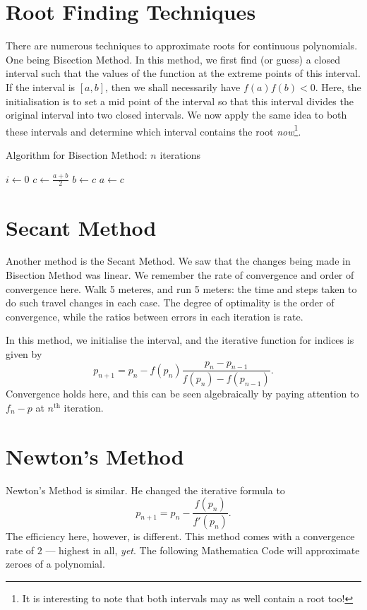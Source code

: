 \section{Root Finding Techniques}

There are numerous techniques to approximate roots for continuous polynomials. One being Bisection Method. In this method, we first find (or guess) a closed interval such that the values of the function at the extreme points of this interval. If the interval is $[a, b]$, then we shall necessarily have $f(a)f(b) < 0$. Here, the initialisation is to set a mid point of the interval so that this interval divides the original interval into two closed intervals. We now apply the same idea to both these intervals and determine which interval contains the root {\itshape now}\footnote{It is interesting to note that both intervals may as well contain a root too!}.

\begin{algorithm}
	\caption{Algorithm for Bisection Method: $n$ iterations}
	\begin{algorithmic}
		\State $i \gets 0$
		\State $c \gets \frac{a + b}2$
		\State $b \gets c$
		\Else
		\State $a \gets c$
		\EndIf
		\EndWhile
	\end{algorithmic}
\end{algorithm}

\section{Secant Method}
Another method is the Secant Method. We saw that the changes being made in Bisection Method was linear. We remember the rate of convergence and order of convergence here. Walk 5 meteres, and run 5 meters: the time and steps taken to do such travel changes in each case. The degree of optimality is the order of convergence, while the ratios between errors in each iteration is rate.

In this method, we initialise the interval, and the iterative function for indices is given by
$$p_{n + 1} = p_n - f(p_n) \frac{p_n - p_{n -1}}{f(p_n) - f(p_{n - 1})}.$$
Convergence holds here, and this can be seen algebraically by paying attention to $f_{n} - p$ at $n^{\mathrm{th}}$ iteration.

\section{Newton's Method}
Newton's Method is similar. He changed the iterative formula to
$$p_{n + 1} = p_n - \frac{f(p_n)}{f'(p_n)}.$$
The efficiency here, however, is different. This method comes with a convergence rate of $2$ --- highest in all, \emph{yet}. The following Mathematica Code will approximate zeroes of a polynomial.

